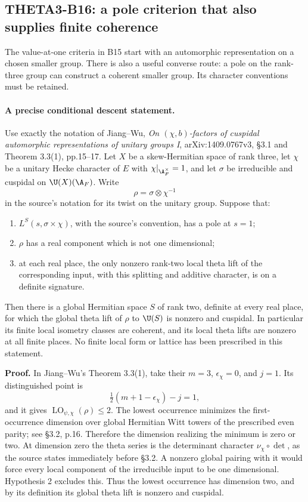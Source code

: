 \subsection{THETA3-B16: a pole criterion that also supplies finite coherence}\label{B16}

The value-at-one criteria in B15 start with an automorphic representation on a chosen smaller group. There is also a useful converse route: a pole on the rank-three group can construct a coherent smaller group. Its character conventions must be retained.

\paragraph{A precise conditional descent statement.}
Use exactly the notation of Jiang--Wu, \emph{On $(\chi,b)$-factors of cuspidal automorphic representations of unitary groups I}, arXiv:1409.0767v3, \S3.1 and Theorem 3.3(1), pp.15--17. Let $X$ be a skew-Hermitian space of rank three, let $\chi$ be a unitary Hecke character of $E$ with $\chi|_{\A_F^\times}=1$, and let $\sigma$ be irreducible and cuspidal on $\U(X)(\A_F)$. Write
\[
 \rho=\sigma\otimes\chi^{-1}
 \tag{B16a}
\]
in the source's notation for its twist on the unitary group. Suppose that:
\begin{enumerate}
\item $L^S(s,\sigma\times\chi)$, with the source's convention, has a pole at $s=1$;
\item $\rho$ has a real component which is not one dimensional;
\item at each real place, the only nonzero rank-two local theta lift of the corresponding input, with this splitting and additive character, is on a definite signature.
\end{enumerate}
Then there is a global Hermitian space $S$ of rank two, definite at every real place, for which the global theta lift of $\rho$ to $\U(S)$ is nonzero and cuspidal. In particular its finite local isometry classes are coherent, and its local theta lifts are nonzero at all finite places. No finite local form or lattice has been prescribed in this statement.

\textbf{Proof.}
In Jiang--Wu's Theorem 3.3(1), take their $m=3$, $\epsilon_\chi=0$, and $j=1$. Its distinguished point is
\[
 \tfrac12(m+1-\epsilon_\chi)-j=1,
\]
and it gives $\operatorname{LO}_{\psi,\chi}(\rho)\leq2$. The lowest occurrence minimizes the first-occurrence dimension over global Hermitian Witt towers of the prescribed even parity; see \S3.2, p.16. Therefore the dimension realizing the minimum is zero or two. At dimension zero the theta series is the determinant character $\nu_\chi\circ\det$, as the source states immediately before \S3.2. A nonzero global pairing with it would force every local component of the irreducible input to be one dimensional. Hypothesis 2 excludes this. Thus the lowest occurrence has dimension two, and by its definition its global theta lift is nonzero and cuspidal.

